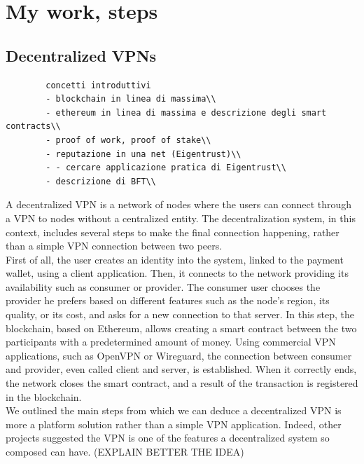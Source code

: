 \documentclass[]{article}
\begin{document}
	\section{My work, steps}
	\subsection{Decentralized VPNs}
	\begin{verbatim}
		concetti introduttivi
		- blockchain in linea di massima\\
		- ethereum in linea di massima e descrizione degli smart contracts\\
		- proof of work, proof of stake\\
		- reputazione in una net (Eigentrust)\\
		- - cercare applicazione pratica di Eigentrust\\
		- descrizione di BFT\\
	\end{verbatim}

	A decentralized VPN is a network of nodes where the users can connect through a VPN to nodes without a centralized entity. The decentralization system, in this context, includes several steps to make the final connection happening, rather than a simple VPN connection between two peers.\\
	First of all, the user creates an identity into the system, linked to the payment wallet, using a client application. Then, it connects to the network providing its availability such as consumer or provider. The consumer user chooses the provider he prefers based on different features such as the node's region, its quality, or its cost, and asks for a new connection to that server. In this step, the blockchain, based on Ethereum, allows creating a smart contract between the two participants with a predetermined amount of money. Using commercial VPN applications, such as OpenVPN or Wireguard, the connection between consumer and provider, even called client and server, is established. When it correctly ends, the network closes the smart contract, and a result of the transaction is registered in the blockchain.\\
	We outlined the main steps from which we can deduce a decentralized VPN is more a platform solution rather than a simple VPN application. Indeed, other projects suggested the VPN is one of the features a decentralized system so composed can have. (EXPLAIN BETTER THE IDEA)  
		          
\end{document}
